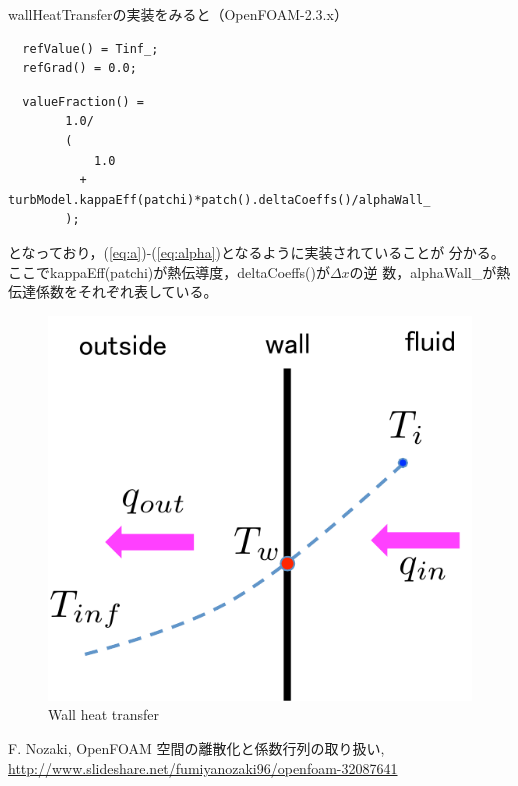 \documentclass[a4paper,fleqn]{jsarticle}
\begin{document}
wallHeatTransferの実装をみると（OpenFOAM-2.3.x）

 \begin{screen}
  \begin{verbatim}
  refValue() = Tinf_;
  refGrad() = 0.0;
  \end{verbatim}
 \end{screen}

 \begin{screen}
  \begin{verbatim}
  valueFraction() =
        1.0/
        (
            1.0
          + turbModel.kappaEff(patchi)*patch().deltaCoeffs()/alphaWall_
        );
  \end{verbatim}
 \end{screen}
となっており，(\ref{eq:a})-(\ref{eq:alpha})となるように実装されていることが
分かる。ここでkappaEff(patchi)が熱伝導度，deltaCoeffs()が$\Delta x$の逆
数，alphaWall\_が熱伝達係数をそれぞれ表している。
 
 \begin{figure}[htbp]
  \begin{center}
   \includegraphics[scale=0.6]{Fig/wallheat.pdf}
   \caption{Wall heat transfer}
   \label{fig:wallheat}
  \end{center}
\end{figure}


\begin{thebibliography}{99}
 F. Nozaki, OpenFOAM 空間の離散化と係数行列の取り扱い, \url{http://www.slideshare.net/fumiyanozaki96/openfoam-32087641}

\end{thebibliography}
\end{document}
